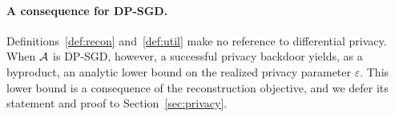 \paragraph{A consequence for DP-SGD.} Definitions~\ref{def:recon} and~\ref{def:util} make no reference to differential privacy. When $\mathcal{A}$ is DP-SGD, however, a successful privacy backdoor yields, as a byproduct, an analytic lower bound on the realized privacy parameter $\varepsilon$. This lower bound is a consequence of the reconstruction objective, and we defer its statement and proof to Section~\ref{sec:privacy}.